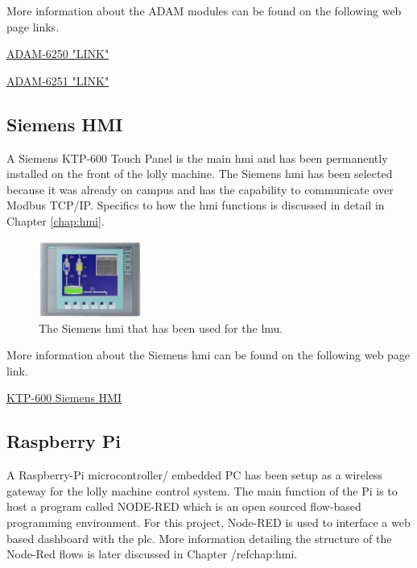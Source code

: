         More information about the ADAM modules can be found on the following web page links.
        
        \href{https://www.advantech.com/en-au/products/7447e150-338d-402d-b5a1-c9ce6d98816e/adam-6250/mod_da940b26-501f-413e-bfbc-732fd7496782}{ADAM-6250 "LINK"} \cite{6250Data} 
    
        \href{https://www.advantech.com/en-au/products/7447e150-338d-402d-b5a1-c9ce6d98816e/adam-6251/mod_98139b28-a181-4c45-83c9-01db52c3db7f}{ADAM-6251 "LINK"} \cite{6251Data} 
        
        
    \subsection{Siemens HMI}
        A Siemens KTP-600 Touch Panel is the main \acrshort{hmi} and has been permanently installed on the front of the lolly machine. The Siemens \acrshort{hmi} has been selected because it was already on campus and has the capability to communicate over Modbus TCP/IP. Specifics to how the \acrshort{hmi} functions is discussed in detail in Chapter \ref{chap:hmi}.
    
        \begin{figure}[H]
            \centering
            \includegraphics[width = 0.3\textwidth]{2_images/ktp600}
            \caption{The Siemens \acrshort{hmi} that has been used for the \acrshort{lmu}\cite{ktp600Data}.}
            \label{fig:hmi}
        \end{figure}
    
        More information about the Siemens \acrshort{hmi} can be found on the following web page link.
    
        \href{https://support.industry.siemens.com/cs/document/31032678/simatic-hmi-hmi-devices-basic-panels?dti=0&lc=en-WW}{KTP-600 Siemens HMI} \cite{ktp600Data} 
        
    
    \subsection{Raspberry Pi}
    A Raspberry-Pi microcontroller/ embedded PC has been setup as a wireless gateway for the lolly machine control system. The main function of the Pi is to host a program called NODE-RED which is an open sourced flow-based programming environment. For this project, Node-RED is used to interface a web based dashboard with the \acrshort{plc}. More information detailing the structure of the Node-Red flows is later discussed in Chapter /ref{chap:hmi}.
    
